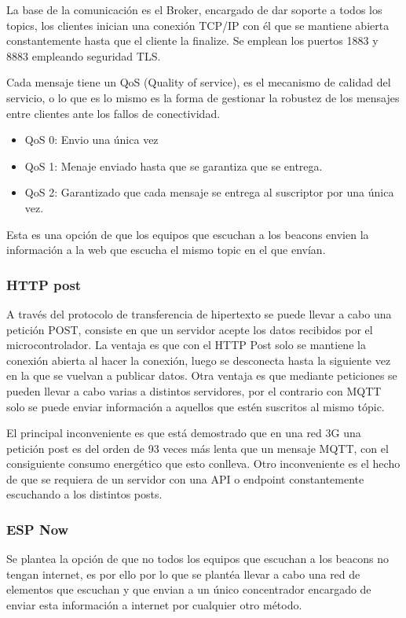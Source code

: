 \documentclass[a4paper ,12pt, onecolumn]{article}
\begin{document}
\begin{enumerate}
                La base de la comunicación es el Broker, encargado de dar soporte a todos los topics, los clientes inician una 
                conexión TCP/IP con él que se mantiene abierta constantemente hasta que el cliente la finalize. Se emplean los puertos
                1883 y 8883 empleando seguridad TLS.

                Cada mensaje tiene un QoS (Quality of service), es el mecanismo de calidad del servicio, o lo que es lo mismo es la forma de
                gestionar la robustez de los mensajes entre clientes ante los fallos de conectividad.
                \begin{itemize}
                    \item QoS 0: Envio una única vez
                    \item QoS 1: Menaje enviado hasta que se garantiza que se entrega.
                    \item QoS 2: Garantizado que cada mensaje se entrega al suscriptor por una única vez.
                \end{itemize}

                Esta es una opción de que los equipos que escuchan a los beacons envien la información a la web que escucha el mismo
                topic en el que envían.
            \subsubsection {HTTP post}
                A través del protocolo de transferencia de hipertexto se puede llevar a cabo una petición POST, consiste en que
                un servidor acepte los datos recibidos por el microcontrolador.
                La ventaja es que con el HTTP Post solo se mantiene la conexión abierta al hacer la conexión, luego se desconecta hasta 
                la siguiente vez en la que se vuelvan a publicar datos. Otra ventaja es que mediante peticiones se pueden llevar a 
                cabo varias a distintos servidores, por el contrario con MQTT solo se puede enviar información a aquellos que estén
                suscritos al mismo tópic.

                El principal inconveniente es que está demostrado que en una red 3G una petición post es del orden de 93 veces
                más lenta que un mensaje MQTT, con el consiguiente consumo energético que esto conlleva. Otro inconveniente es el hecho 
                de que se requiera de un servidor con una API o endpoint constantemente escuchando a los distintos posts.
            \subsubsection {ESP Now}
                Se plantea la opción de que no todos los equipos que escuchan a los beacons no tengan internet, es por ello por lo 
                que se plantéa llevar a cabo una red de elementos que escuchan y que envian a un único concentrador encargado de enviar
                esta información a internet por cualquier otro método.


\end{enumerate}
\end{document}
